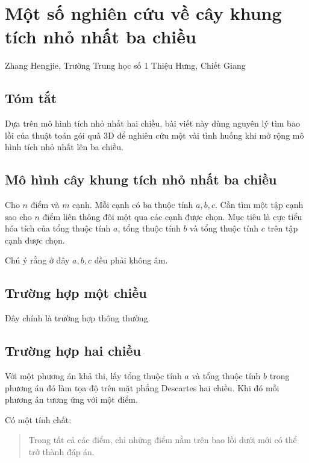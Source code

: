 \documentclass[11pt]{article}
\begin{document}
\section{Một số nghiên cứu về cây khung tích nhỏ nhất ba chiều}

\begin{center}
Zhang Hengjie, Trường Trung học số 1 Thiệu Hưng, Chiết Giang
\end{center}

\subsection*{Tóm tắt}

Dựa trên mô hình tích nhỏ nhất hai chiều, bài viết này dùng nguyên lý tìm bao
lồi của thuật toán gói quà 3D để nghiên cứu một vài tình huống khi mở rộng mô
hình tích nhỏ nhất lên ba chiều.

\subsection{Mô hình cây khung tích nhỏ nhất ba chiều}

Cho \(n\) điểm và \(m\) cạnh. Mỗi cạnh có ba thuộc tính \(a,b,c\). Cần tìm một
tập cạnh sao cho \(n\) điểm liên thông đôi một qua các cạnh được chọn. Mục tiêu
là cực tiểu hóa tích của tổng thuộc tính \(a\), tổng thuộc tính \(b\) và tổng
thuộc tính \(c\) trên tập cạnh được chọn.

Chú ý rằng ở đây \(a,b,c\) đều phải không âm.

\subsection{Trường hợp một chiều}

Đây chính là trường hợp thông thường.

\subsection{Trường hợp hai chiều}

Với một phương án khả thi, lấy tổng thuộc tính \(a\) và tổng thuộc tính \(b\)
trong phương án đó làm tọa độ trên mặt phẳng Descartes hai chiều. Khi đó mỗi
phương án tương ứng với một điểm.

Có một tính chất:

\begin{quote}
Trong tất cả các điểm, chỉ những điểm nằm trên bao lồi dưới mới có thể trở
thành đáp án.
\end{quote}
\end{document}
